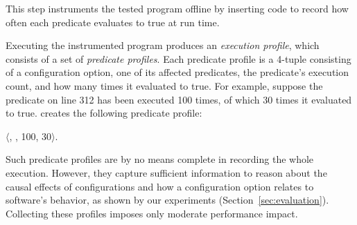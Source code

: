 
This step instruments the tested program offline
by inserting code to record how often each predicate evaluates to true
at run time.

% 
% 
% 
% 

Executing the instrumented program produces an \textit{execution profile}, which
consists of a set of \textit{predicate profiles}.
Each predicate profile is a 4-tuple consisting of a configuration option,
one of its affected predicates, the predicate's execution count, and how
many times it evaluated to true. For example,
suppose the predicate on line 312 has been executed 100 times, of which
30 times it evaluated to true. \ourtool creates the following predicate
profile:

\noindent $\langle$, , 100, 30$\rangle$.

\smallskip


Such predicate profiles are by no means complete in
recording the whole execution.
However, they capture
sufficient information to reason about the causal effects of configurations
and how a configuration option relates to software's behavior, as shown by 
our experiments (Section~\ref{sec:evaluation}).  
Collecting these profiles imposes only moderate performance impact.


